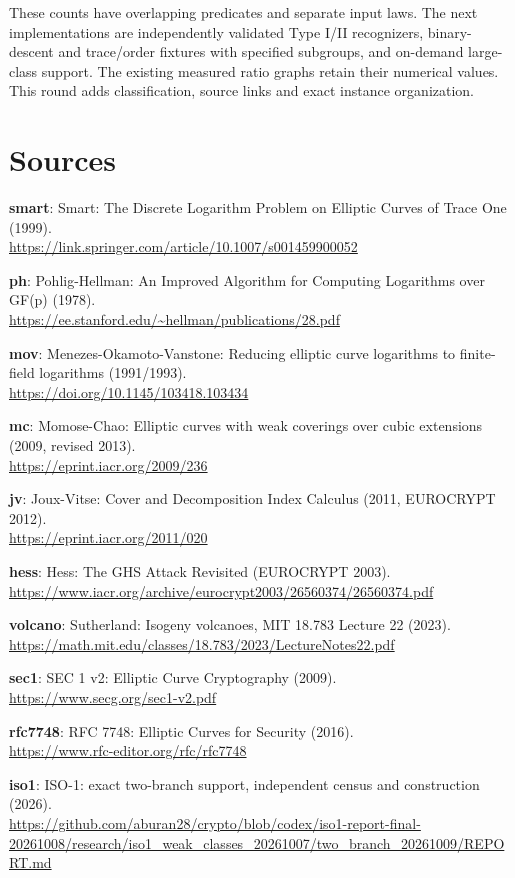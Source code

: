\documentclass[10pt]{article}
\begin{document}
These counts have overlapping predicates and separate input laws. The next implementations are independently validated Type I/II recognizers, binary-descent and trace/order fixtures with specified subgroups, and on-demand large-class support. The existing measured ratio graphs retain their numerical values. This round adds classification, source links and exact instance organization.
\section{Sources}
\textbf{smart}: Smart: The Discrete Logarithm Problem on Elliptic Curves of Trace One (1999).\\\url{https://link.springer.com/article/10.1007/s001459900052}\par
\textbf{ph}: Pohlig-Hellman: An Improved Algorithm for Computing Logarithms over GF(p) (1978).\\\url{https://ee.stanford.edu/~hellman/publications/28.pdf}\par
\textbf{mov}: Menezes-Okamoto-Vanstone: Reducing elliptic curve logarithms to finite-field logarithms (1991/1993).\\\url{https://doi.org/10.1145/103418.103434}\par
\textbf{mc}: Momose-Chao: Elliptic curves with weak coverings over cubic extensions (2009, revised 2013).\\\url{https://eprint.iacr.org/2009/236}\par
\textbf{jv}: Joux-Vitse: Cover and Decomposition Index Calculus (2011, EUROCRYPT 2012).\\\url{https://eprint.iacr.org/2011/020}\par
\textbf{hess}: Hess: The GHS Attack Revisited (EUROCRYPT 2003).\\\url{https://www.iacr.org/archive/eurocrypt2003/26560374/26560374.pdf}\par
\textbf{volcano}: Sutherland: Isogeny volcanoes, MIT 18.783 Lecture 22 (2023).\\\url{https://math.mit.edu/classes/18.783/2023/LectureNotes22.pdf}\par
\textbf{sec1}: SEC 1 v2: Elliptic Curve Cryptography (2009).\\\url{https://www.secg.org/sec1-v2.pdf}\par
\textbf{rfc7748}: RFC 7748: Elliptic Curves for Security (2016).\\\url{https://www.rfc-editor.org/rfc/rfc7748}\par
\textbf{iso1}: ISO-1: exact two-branch support, independent census and construction (2026).\\\url{https://github.com/aburan28/crypto/blob/codex/iso1-report-final-20261008/research/iso1_weak_classes_20261007/two_branch_20261009/REPORT.md}\par
\end{document}
